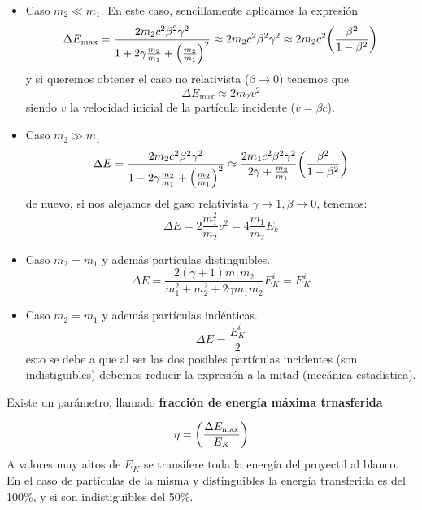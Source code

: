 \begin{itemize}
    \item Caso $m_2 \ll m_1$. En este caso, sencillamente aplicamos la expresión 
    \begin{equation}    
        \Delta E_{\max} =\frac{2 m_2 c^2 \beta^2 \gamma^2}{1+ 2 \gamma \frac{m_2}{m_1} + \pqty{\frac{m_2}{m_1} }^2} \approx  2 m_2 c^2 \beta^2 \gamma^2 \approx 2 m_2 c^2  \pqty{\frac{\beta^2}{1-\beta^2}}
    \end{equation}
    y si queremos obtener el caso no relativista ($\beta \to 0$) tenemos que
    \begin{equation}
        \Delta E_{\max} \approx 2 m_2 v^2 
    \end{equation}
    siendo $v$ la velocidad inicial de la partícula incidente ($v=\beta c$).
    \item Caso $m_2 \gg m_1$
    \begin{equation}
        \Delta E  =\frac{2 m_2 c^2 \beta^2 \gamma^2}{1+ 2 \gamma \frac{m_2}{m_1} + \pqty{\frac{m_2}{m_1} }^2}  \approx   \frac{2m_1c^2 \beta^2 \gamma^2}{2\gamma + \frac{m_2}{m_1}} \pqty{\frac{\beta^2}{1-\beta^2}}
    \end{equation}
    de nuevo, si nos alejamos del gaso relativista $\gamma \to 1, \beta \to 0$, tenemos:
    \begin{equation}
        \Delta E = 2 \frac{m_1^2}{m_2} v^2  = 4 \frac{m_1}{m_2} E_k
    \end{equation}
    \item Caso $m_2 = m_1$ y además partículas distinguibles.
    \begin{equation}
        \Delta E = \frac{2(\gamma+1)m_1m_2}{m_1^2 + m_2^2 + 2 \gamma m_1 m_2} E_K^i = E_K^i
    \end{equation}
    \item Caso $m_2 = m_1$ y además partículas indénticas.
    \begin{equation}
        \Delta E = \frac{E_K^i}{2} 
    \end{equation}
    esto se debe a que al ser las dos posibles partículas incidentes (son indistiguibles) debemos reducir la expresión a la mitad (mecánica estadística).
\end{itemize}
Existe un parámetro, llamado \textbf{fracción de energía máxima trnasferida} 

\begin{equation}
    \eta = \pqty{\frac{\Delta E_{\max}}{E_K}} 
\end{equation}
A valores muy altos de $E_K$ se transifere toda la energía del proyectil al blanco. En el caso de partículas de la misma y distinguibles la energía transferida es del 100\%, y si son indistiguibles del 50\%.


